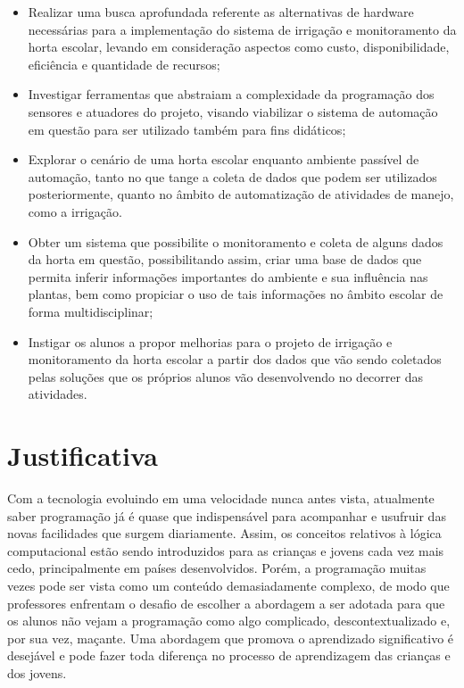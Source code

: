 \documentclass[12pt]{article}
\begin{document}
	\begin{itemize}
    	\item Realizar uma busca aprofundada referente as alternativas de hardware necessárias para a implementação do sistema de irrigação e monitoramento da horta escolar, levando em consideração aspectos como custo, disponibilidade, eficiência e quantidade de recursos;
    
		\item Investigar ferramentas que abstraiam a complexidade da programação dos sensores e atuadores do projeto, visando viabilizar o sistema de automação em questão para ser utilizado também para fins didáticos;
        
        \item  Explorar o cenário de uma horta escolar enquanto ambiente passível de automação, tanto no que tange a coleta de dados que podem ser utilizados posteriormente, quanto no âmbito de automatização de atividades de manejo, como a irrigação.  
		
        \item Obter um sistema que possibilite o monitoramento e coleta de alguns dados da horta em questão, possibilitando assim, criar uma base de dados que permita inferir informações importantes do ambiente e sua influência nas plantas, bem como propiciar o uso de tais informações no âmbito escolar de forma multidisciplinar;
        
		\item Instigar os alunos a propor melhorias para o projeto de irrigação e monitoramento da horta escolar a partir dos dados que vão sendo coletados pelas soluções que os próprios alunos vão desenvolvendo no decorrer das atividades.
	\end{itemize}
	
	\section{Justificativa}	
Com a tecnologia evoluindo em uma velocidade nunca antes vista, atualmente saber programação já é quase que indispensável para acompanhar e usufruir das novas facilidades que surgem diariamente. Assim, os conceitos relativos à lógica computacional estão sendo introduzidos para as crianças e jovens cada vez mais cedo, principalmente em países desenvolvidos. Porém, a programação muitas vezes pode ser vista como um conteúdo demasiadamente complexo, de modo que professores enfrentam o desafio de escolher a abordagem a ser adotada para que os alunos não vejam a programação como algo complicado,  descontextualizado e, por sua vez, maçante. Uma abordagem que promova o aprendizado significativo é desejável e  pode fazer toda diferença no processo de aprendizagem das crianças e dos jovens.
\end{document}
